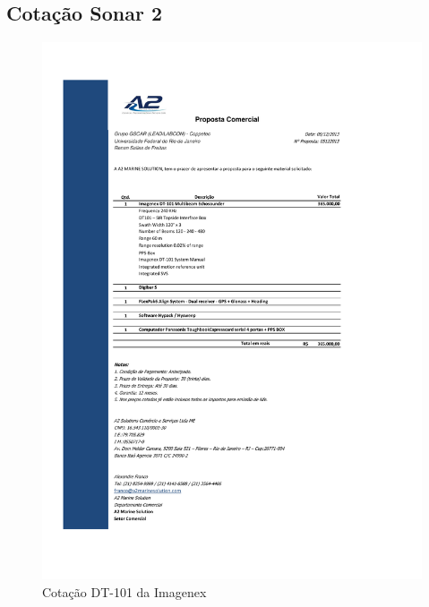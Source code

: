 \subsection{Cotação Sonar 2 }
\begin{figure}[H]
 \centering
 \includegraphics[width=1\columnwidth]{Seaking_profiler/price_quote_1.pdf}
 \caption{Cotação DT-101 da Imagenex}
\end{figure}

